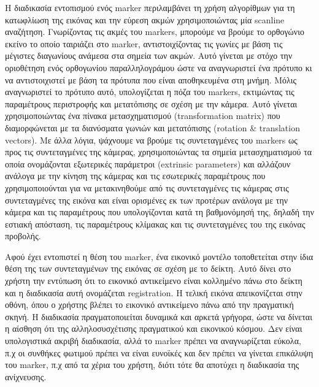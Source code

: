 Η διαδικασία εντοπισμού ενός marker περιλαμβάνει τη χρήση αλγορίθμων για τη κατωφλίωση της εικόνας και την εύρεση ακμών χρησιμοποιώντας μία scanline αναζήτηση.  Γνωρίζοντας τις ακμές του markers, μπορούμε να βρούμε το ορθογώνιο εκείνο το οποίο ταιριάζει στο marker, αντιστοιχίζοντας τις γωνίες με βάση τις μέγιστες διαγωνίους ανάμεσα στα σημεία των ακμών. Αυτό γίνεται με στόχο την οριοθέτηση ενός ορθογωνίου παραλληλογράμου ώστε να αναγνωριστεί ένα πρότυπο κι να αντιστοιχιστεί με βάση τα πρότυπα που είναι αποθηκευμένα στη μνήμη. Μόλις αναγνωριστεί το πρότυπο αυτό, υπολογίζεται η πόζα του markers, εκτιμώντας τις παραμέτρους περιστροφής και μετατόπισης σε σχέση με την κάμερα. Αυτό γίνεται χρησιμοποιώντας ένα πίνακα μετασχηματισμού (transformation matrix) που διαμορφώνεται με τα διανύσματα γωνιών και μετατόπισης (rotation \& translation vectors). Με άλλα λόγια, ψάχνουμε να βρούμε τις συντεταγμένες του markers ως προς τις συντεταγμένες της κάμερας, χρησιμοποιώντας τα σημεία μετασχηματισμού τα οποία ονομάζονται εξωτερικές παράμετροι (extrinsic parameters) και αλλάζουν ανάλογα με την κίνηση της κάμερας και τις εσωτερικές παραμέτρους που χρησιμοποιούνται για να μετακινηθούμε από τις συντεταγμένες τις κάμερας στις συντεταγμένες της εικόνα και είναι ορισμένες εκ των προτέρων ανάλογα με την κάμερα και τις παραμέτρους που υπολογίζονται κατά τη βαθμονόμησή της, δηλαδή την εστιακή απόσταση, τις παραμέτρους κλίμακας και τις συντεταγμένες του της εικόνας προβολής.

Αφού έχει εντοπιστεί η θέση του marker, ένα εικονικό μοντέλο τοποθετείται στην ίδια θέση της των συντεταγμένων της εικόνας σε σχέση με το δείκτη. Αυτό δίνει στο χρήστη την εντύπωση ότι το εικονικό αντικείμενο είναι κολλημένο πάνω στο δείκτη και η διαδικασία αυτή ονομάζεται registration. Η τελική εικόνα απεικονίζεται στην οθόνη, όπου ο χρήστης βλέπει το εικονικό αντικείμενο πάνω από την πραγματική σκηνή. Η διαδικασία πραγματοποιείται δυναμικά και αρκετά γρήγορα, ώστε να δίνεται η αίσθηση ότι της αλληλοσυσχέτισης πραγματικού και εικονικού κόσμου. Δεν είναι υπολογιστικά ακριβή διαδικασία, αλλά το marker πρέπει να αναγνωρίζεται εύκολα, π.χ οι συνθήκες φωτιμού πρέπει να είναι ευνοϊκές και δεν πρέπει να γίνεται επικάλυψη του marker, π.χ από τα χέρια του χρήστη, διότι τότε θα αποτύχει η διαδικασία της ανίχνευσης. 


